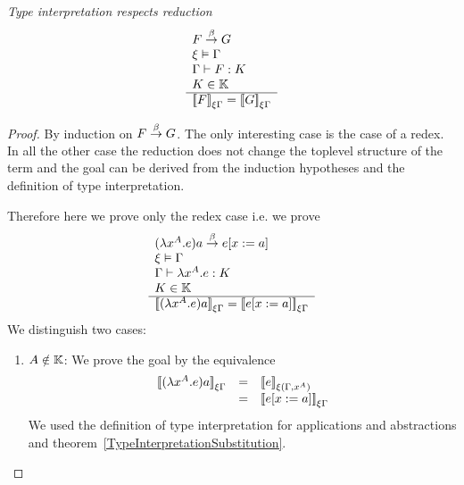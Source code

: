 \begin{theorem}
    \label{TypeInterpretationRespectsReduction}
    \emph{Type interpretation respects reduction}
    $$
    \begin{array}{l} 
        F \stackrel{\beta}{\to} G
        \\
        \xi \vDash \Gamma
        \\
        \Gamma \vdash F : K
        \\
        K \in \mathbb{K}
     \\ \hline 
        {{[\![}F{]\!]}}_{\xi\Gamma} = {{[\![} G{]\!]}}_{\xi\Gamma}
    \end{array}
    $$
    \begin{proof} By induction on $F \stackrel{\beta}{\to} G$. The only interesting case is
        the case of a redex. In all the other case the reduction does not change
        the toplevel structure of the term and the goal can be derived from the
        induction hypotheses and the definition of type interpretation.

        Therefore here we prove only the redex case i.e. we prove
        $$
        \begin{array}{l} 
            (\lambda x^A.e)a \stackrel{\beta}{\to} e[x:=a]
            \\
            \xi \vDash \Gamma
            \\
            \Gamma \vdash \lambda x^A.e : K
            \\
            K \in \mathbb{K}
         \\ \hline 
            {{[\![}(\lambda x^A.e) a{]\!]}}_{\xi\Gamma}
            =
            {{[\![} e[x:=a]{]\!]}}_{\xi\Gamma}
        \end{array}
        $$
        We distinguish two cases:
        \begin{enumerate}
        \item $A \notin \mathbb{K}$: We prove the goal by the equivalence
            $$
            \begin{array}{lll}
                {{[\![}(\lambda x^A.e)a{]\!]}}_{\xi\Gamma}
                &=&
                {{[\![} e{]\!]}}_{\xi(\Gamma,x^A)}
                \\
                &=&
                {{[\![} e[x:=a]{]\!]}}_{\xi\Gamma}
            \end{array}
            $$
            We used the definition of type interpretation for applications and
                abstractions and
                theorem~\ref{TypeInterpretationSubstitution}.


\end{enumerate}
\end{proof}
\end{theorem}
